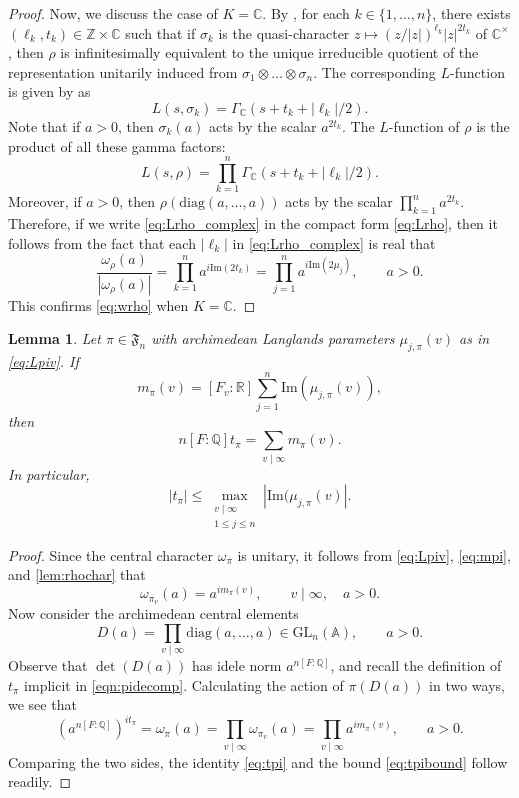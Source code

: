 \documentclass[12pt]{amsart}
\newtheorem{lemma}[theorem]{Lemma}
\theoremstyle{definition}
\theoremstyle{remark}
\numberwithin{equation}{section}
\theoremstyle{plain}
\renewcommand{\Im}{\mathrm{Im}}
\newcommand{\GL}{\mathrm{GL}}
\newcommand{\diag}{\mathrm{diag}}
\newcommand{\A}{\mathbb{A}}
\newcommand{\Z}{\mathbb{Z}}
\newcommand{\Q}{\mathbb{Q}}
\newcommand{\R}{\mathbb{R}}
\newcommand{\CC}{\mathbb{C}}
\begin{document}
\begin{proof}
Now, we discuss the case of $K=\CC$. By \cite[Theorem~4]{Knapp}, for each $k\in\{1,\dotsc,n\}$, there exists $(\ell_k,t_k)\in\Z\times\CC$ such that if $\sigma_k$ is the quasi-character $z\mapsto(z/|z|)^{\ell_k} |z|^{2t_k}$ of $\CC^{\times}$, then $\rho$ is infinitesimally equivalent to the unique irreducible quotient of the representation unitarily induced from $\sigma_1\otimes\dots\otimes\sigma_n$. The corresponding $L$-function is given by \cite[(4.6)]{Knapp} as
\[L(s,\sigma_k)=\Gamma_\CC(s+t_k+|\ell_k|/2).\]
Note that if $a>0$, then $\sigma_k(a)$ acts by the scalar $a^{2t_k}$. The $L$-function of $\rho$ is the product of all these gamma factors:
\begin{equation}\label{eq:Lrho_complex}
L(s,\rho)=\prod_{k=1}^n\Gamma_\CC(s+t_k+|\ell_k|/2).
\end{equation}
Moreover, if $a>0$, then $\rho(\diag(a,\dotsc,a))$ acts by the scalar $\prod_{k=1}^n a^{2t_k}$. Therefore, if we write \eqref{eq:Lrho_complex} in the compact form \eqref{eq:Lrho}, then it follows from the fact that each $|\ell_k|$ in \eqref{eq:Lrho_complex} is real that
\[\frac{\omega_\rho(a)}{|\omega_\rho(a)|}=\prod_{k=1}^n a^{i\Im(2t_k)}=\prod_{j=1}^n a^{i\Im(2\mu_j)},\qquad a>0.\]
This confirms \eqref{eq:wrho} when $K=\CC$.
\end{proof}

\begin{lemma}
\label{tpiformula}
Let $\pi\in\mathfrak{F}_n$ with archimedean Langlands parameters $\mu_{j,\pi}(v)$ as in \eqref{eq:Lpiv}.  If
\begin{equation}\label{eq:mpi}
m_{\pi}(v)=[F_v:\R]\sum_{j=1}^n \Im(\mu_{j,\pi}(v)),
\end{equation}
then
\begin{equation}\label{eq:tpi}
n[F:\Q]t_\pi=\sum_{v\mid\infty}m_{\pi}(v).
\end{equation}
In particular,
\begin{equation}\label{eq:tpibound}
|t_\pi|\leq\max_{\substack{v\mid\infty\\1\leq j\leq n}}|\Im(\mu_{j,\pi}(v)|.
\end{equation}
\end{lemma}

\begin{proof}
Since the central character $\omega_\pi$ is unitary, it follows from \eqref{eq:Lpiv}, \eqref{eq:mpi}, and \cref{lem:rhochar} that
\[
\omega_{\pi_v}(a)=a^{im_{\pi}(v)},\qquad v\mid\infty,\quad a>0.
\]
Now consider the archimedean central elements
\[
D(a)=\prod_{v\mid\infty}\diag(a,\dotsc,a)\in\GL_n(\A),\qquad a>0.
\]
Observe that $\det(D(a))$ has idele norm $a^{n[F:\Q]}$, and recall the definition of $t_\pi$ implicit in \eqref{eqn:pidecomp}. Calculating the action of $\pi(D(a))$ in two ways, we see that
\[
(a^{n[F:\Q]})^{it_\pi}=\omega_\pi(a)=\prod_{v\mid\infty}\omega_{\pi_v}(a)=\prod_{v\mid\infty}a^{im_{\pi}(v)},\qquad a>0.
\]
Comparing the two sides, the identity \eqref{eq:tpi} and the bound \eqref{eq:tpibound} follow readily.
\end{proof}
\end{document}
